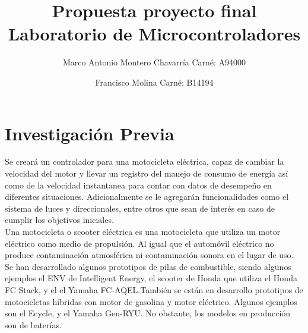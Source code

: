 \documentclass[letterpaper]{article}
\begin{document}
\title{Propuesta proyecto final\\ Laboratorio de Microcontroladores}
\author{
 Marco Antonio Montero Chavarrí­a Carné: A94000\\
  \and
  Francisco Molina Carné: B14194\\  
}
\maketitle

\section{Investigación Previa}
Se creará un controlador para una motocicleta eléctrica, capaz de cambiar la velocidad del motor y llevar un registro del manejo de consumo de energía así como de la velocidad instantanea para contar con datos de desempeño en diferentes situaciones. Adicionalmente se le agregarán funcionalidades como el sistema de luces y direccionales, entre otros que sean de interés en caso de cumplir los objetivos iniciales.\\

Una motocicleta o scooter eléctrica es una motocicleta que utiliza un motor eléctrico como medio de propulsión.
Al igual que el automóvil eléctrico no produce contaminación atmosférica ni contaminación sonora en el lugar de uso.
Se han desarrollado algunos prototipos de pilas de combustible, siendo algunos ejemplos el ENV de Intelligent Energy, 
el scooter de Honda que utiliza el Honda FC Stack, y el el Yamaha FC-AQEL.También se están en desarrollo prototipos de 
motocicletas híbridas con motor de gasolina y motor eléctrico. Algunos ejemplos son el Ecycle, y el Yamaha Gen-RYU.
No obstante, los modelos en producción son de baterías. \\
\end{document}

